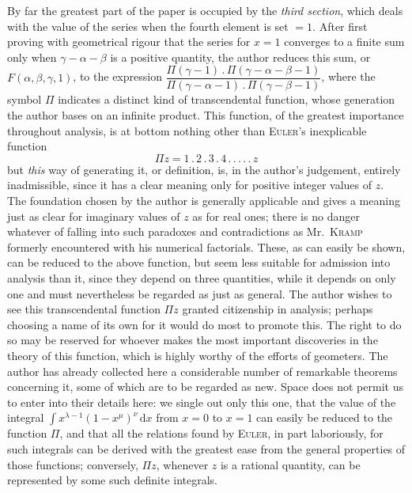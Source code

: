 By far the greatest part of the paper is occupied by the \textit{third section}, which deals with the value of the series when the fourth element is set $=1$. After first proving with geometrical rigour that the series for $x=1$ converges to a finite sum only when $\gamma-\alpha-\beta$ is a positive quantity, the author reduces this sum, or $F(\alpha,\beta,\gamma,1)$, to the expression $\dfrac{\Pi(\gamma-1)\,.\,\Pi(\gamma-\alpha-\beta-1)}{\Pi(\gamma-\alpha-1)\,.\,\Pi(\gamma-\beta-1)}$, where the symbol $\Pi$ indicates a distinct kind of transcendental function, whose generation the author bases on an infinite product. This function, of the greatest importance throughout analysis, is at bottom nothing other than \textsc{Euler}'s inexplicable function
\[
\Pi z=1\,.\,2\,.\,3\,.\,4\,.\,.\,.\,.\,.\,z
\]
but \textit{this} way of generating it, or definition, is, in the author's judgement, entirely inadmissible, since it has a clear meaning only for positive integer values of $z$. The foundation chosen by the author is generally applicable and gives a meaning just as clear for imaginary values of $z$ as for real ones; there is no danger whatever of falling into such paradoxes and contradictions as Mr.\ \textsc{Kramp} formerly encountered with his numerical factorials. These, as can easily be shown, can be reduced to the above function, but seem less suitable for admission into analysis than it, since they depend on three quantities, while it depends on only one and must nevertheless be regarded as just as general. The author wishes to see this transcendental function $\Pi z$ granted citizenship in analysis; perhaps choosing a name of its own for it would do most to promote this. The right to do so may be reserved for whoever makes the most important discoveries in the theory of this function, which is highly worthy of the efforts of geometers. The author has already collected here a considerable number of remarkable theorems concerning it, some of which are to be regarded as new. Space does not permit us to enter into their details here: we single out only this one, that the value of the integral $\int x^{\lambda-1}(1-x^\mu)^\nu\,\mathrm{d}x$ from $x=0$ to $x=1$ can easily be reduced to the function $\Pi$, and that all the relations found by \textsc{Euler}, in part laboriously, for such integrals can be derived with the greatest ease from the general properties of those functions; conversely, $\Pi z$, whenever $z$ is a rational quantity, can be represented by some such definite integrals.

